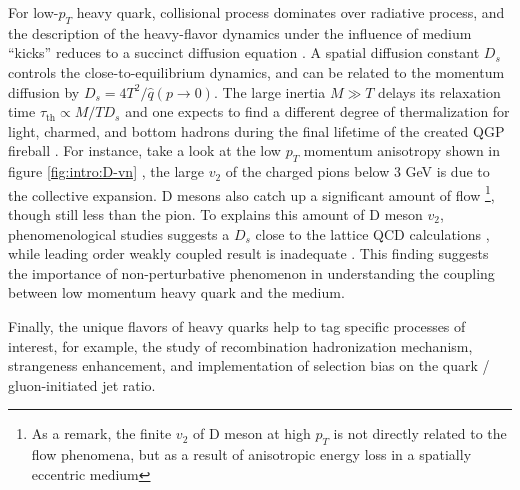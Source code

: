For low-$p_T$ heavy quark, collisional process dominates over radiative process, and the description of the heavy-flavor dynamics under the influence of medium ``kicks'' reduces to a succinct diffusion equation \cite{Moore:2004tg}.
A spatial diffusion constant $D_s$ controls the close-to-equilibrium dynamics, and can be related to the momentum diffusion by $D_s = 4T^2/\hat{q}(p\rightarrow 0)$.
The large inertia $M\gg T$ delays its relaxation time $\tau_{\textrm{th}} \propto M/T D_s$ and one expects to find a different degree of thermalization for light, charmed, and bottom hadrons during the final lifetime of the created QGP fireball \cite{PhysRevD.37.2484,Moore:2004tg,Riek:2010fk,Cao:2013ita}.
For instance, take a look at the low $p_T$ momentum anisotropy shown in figure \ref{fig:intro:D-vn} \cite{Acharya:2017qps,Sirunyan:2017plt},
the large $v_2$ of the charged pions below $3$ GeV is due to the collective expansion.
D mesons also catch up a significant amount of flow \footnote{\singlespacing As a remark, the finite $v_2$ of D meson at high $p_T$ is not directly related to the flow phenomena, but as a result of anisotropic energy loss in a spatially eccentric medium}, though still less than the pion.
To explains this amount of D meson $v_2$, phenomenological studies suggests a $D_s$ close to the lattice QCD calculations \cite{He:2012df,Cao:2013ita,Xu:2017obm,Banerjee:2011ra,Ding:2012sp,Francis:2015daa}, while leading order weakly coupled result \cite{Moore:2004tg} is inadequate . 
This finding suggests the importance of non-perturbative phenomenon in understanding the coupling between low momentum heavy quark and the medium.

Finally, the unique flavors of heavy quarks help to tag specific processes of interest,
for example, the study of recombination hadronization mechanism, strangeness enhancement, and implementation of selection bias on the quark / gluon-initiated jet ratio.

